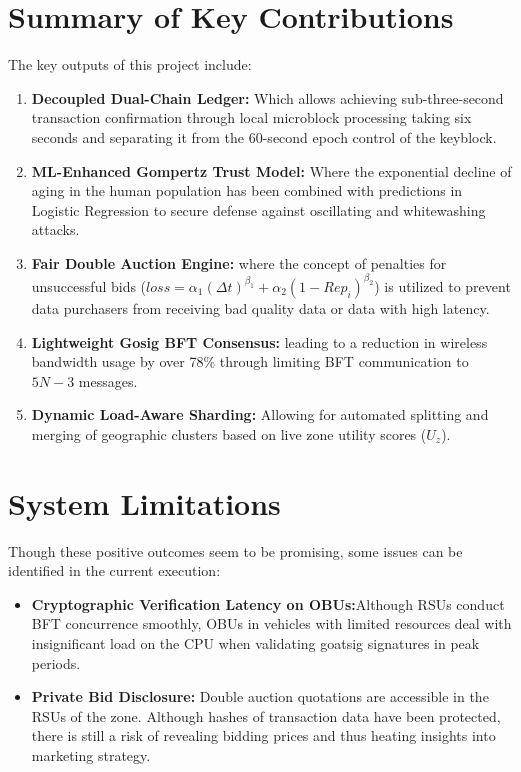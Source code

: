 \section{Summary of Key Contributions}\label{sec:conclusion_contributions}
\noindent The key outputs of this project include:
\begin{enumerate}
    \item \textbf{Decoupled Dual-Chain Ledger:} Which allows achieving sub-three-second transaction confirmation through local microblock processing taking six seconds and separating it from the 60-second epoch control of the keyblock.
    \item \textbf{ML-Enhanced Gompertz Trust Model:} Where the exponential decline of aging in the human population has been combined with predictions in Logistic Regression to secure defense against oscillating and whitewashing attacks.
    \item \textbf{Fair Double Auction Engine:} where the concept of penalties for unsuccessful bids ($loss = \alpha_1 (\Delta t)^{\beta_1} + \alpha_2 (1 - Rep_i)^{\beta_2}$) is utilized to prevent data purchasers from receiving bad quality data or data with high latency.
    \item \textbf{Lightweight Gosig BFT Consensus:} leading to a reduction in wireless bandwidth usage by over 78\% through limiting BFT communication to $5N-3$ messages.
    \item \textbf{Dynamic Load-Aware Sharding:} Allowing for automated splitting and merging of geographic clusters based on live zone utility scores ($U_z$).
\end{enumerate}

\section{System Limitations}\label{sec:conclusion_limitations}
\noindent Though these positive outcomes seem to be promising, some issues can be identified in the current execution:
\begin{itemize}
    \item \textbf{Cryptographic Verification Latency on OBUs:}Although RSUs conduct BFT concurrence smoothly, OBUs in vehicles with limited resources deal with insignificant load on the CPU when validating goatsig signatures in peak periods.
    \item \textbf{Private Bid Disclosure:} Double auction quotations are accessible in the RSUs of the zone. Although hashes of transaction data have been protected, there is still a risk of revealing bidding prices and thus heating insights into marketing strategy.
\end{itemize}

